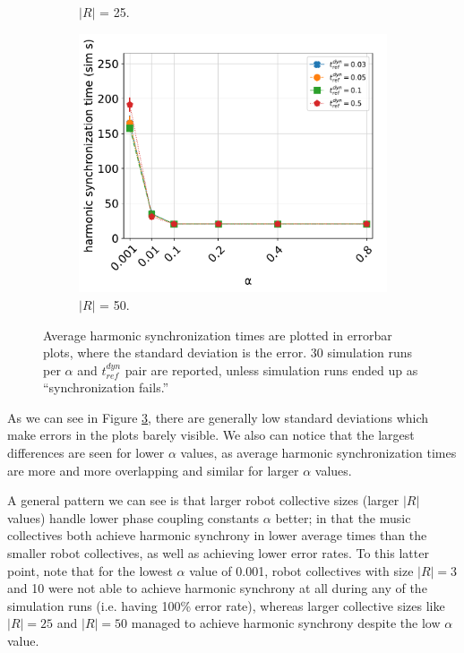 \begin{figure}[ht!]
\begin{subfigure}[b]{0.5\textwidth}
			\caption{$|R|$ = 25.}
			\label{fig:sub:t_ref_dyn_x_alpha_collsize25}
		  \end{subfigure}
		  \begin{subfigure}[b]{0.5\textwidth}
			\centering\captionsetup{width=.9\linewidth}%
			\includegraphics[width=\textwidth]{Assets/DocSegments/Chapters/ExperimentsAndResults/Figures/PerfScores/t_ref_dyn_x_alpha_hyperparamtuning_experiment_plot_collsize50.pdf}
			\caption{$|R|$ = 50.}
			\label{fig:sub:t_ref_dyn_x_alpha_collsize50}
		  \end{subfigure}
		  \caption{Average harmonic synchronization times are plotted in errorbar plots, where the standard deviation is the error. 30 simulation runs per $\alpha$ and $t_{ref}^{dyn}$ pair are reported, unless simulation runs ended up as ``synchronization fails.''}
		  \label{fig:phase_sync_hyperparam_tuning_experiment}
		\end{figure}
		
		As we can see in Figure \ref{fig:phase_sync_hyperparam_tuning_experiment}, there are generally low standard deviations which make errors in the plots barely visible. We also can notice that the largest differences are seen for lower $\alpha$ values, as average harmonic synchronization times are more and more overlapping and similar for larger $\alpha$ values.
		
		A general pattern we can see is that larger robot collective sizes (larger $|R|$ values) handle lower phase coupling constants $\alpha$ better; in that the music collectives both achieve harmonic synchrony in lower average times than the smaller robot collectives, as well as achieving lower error rates. To this latter point, note that for the lowest $\alpha$ value of 0.001, robot collectives with size $|R|=3$ and 10 were not able to achieve harmonic synchrony at all during any of the simulation runs (i.e. having 100\% error rate), whereas larger collective sizes like $|R|=25$ and $|R|=50$ managed to achieve harmonic synchrony despite the low $\alpha$ value. 
		
